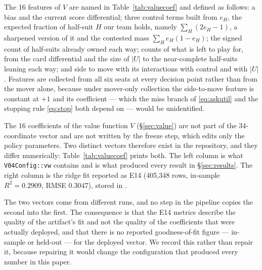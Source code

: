 \documentclass[11pt]{article}
\theoremstyle{definition}
\newcommand{\numValueRows}{405{,}348}
\newcommand{\numValueRSq}{0.2909}
\newcommand{\numValueRmse}{0.3047}
\newcommand{\numParams}{34}
\newcommand{\numValueFeats}{16}
\begin{document}
The \numValueFeats{} features of $V$ are named in Table~\ref{tab:valuecoef} and
defined as follows: a bias and the current score differential; three control
terms built from $e_H$, the expected fraction of half-suit $H$ our team holds,
namely $\sum_H (2e_H - 1)$, a sharpened version of it and the contested mass
$\sum_H e_H(1-e_H)$; the signed count of half-suits already owned each way;
counts of what is left to play for, from the card differential and the size of
$|U|$ to the near-complete half-suits leaning each way; and side to move with its
interactions with control and with $|U|$. Features are collected from all six
seats at every decision point rather than from the mover alone, because under
mover-only collection the side-to-move feature is constant at $+1$ and its
coefficient --- which the miss branch of \eqref{eq:askutil} and the stopping rule
\eqref{eq:stop} both depend on --- would be unidentified.

The \numValueFeats{} coefficients of the value function $V$ (\S\ref{sec:value})
are not part of the \numParams{}-coordinate vector and are not written by the
freeze step, which edits only the policy parameters. Two distinct vectors
therefore exist in the repository, and they differ numerically:
Table~\ref{tab:valuecoef} prints both. The left column is what
\texttt{V04Config::vw} contains and is what produced every result in
\S\ref{sec:results}. The right column is the ridge fit reported as E14
(\numValueRows{} rows, in-sample $R^2 = \numValueRSq$, RMSE \numValueRmse{}),
stored in .

The two vectors come from different runs, and no step in the pipeline copies the
second into the first. The consequence is that the
E14 metrics describe the quality of the artifact's fit and not the quality of the
coefficients that were actually deployed, and that there is no reported
goodness-of-fit figure --- in-sample or held-out --- for the deployed vector. We
record this rather than repair it, because repairing it would change the
configuration that produced every number in this paper.
\end{document}
